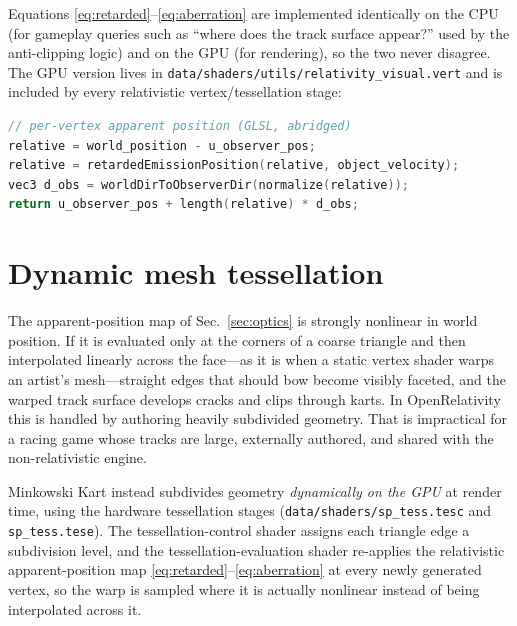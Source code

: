\documentclass[aip,amsmath,amssymb,reprint,nofootinbib]{revtex4-2}
\begin{document}
Equations \eqref{eq:retarded}--\eqref{eq:aberration} are implemented identically
on the CPU (for gameplay queries such as ``where does the track surface appear?''
used by the anti-clipping logic) and on the GPU (for rendering), so the two never
disagree. The GPU version lives in
\texttt{data/shaders/utils/relativity\_visual.vert} and is included by every
relativistic vertex/tessellation stage:

\begin{lstlisting}[language=C]
// per-vertex apparent position (GLSL, abridged)
relative = world_position - u_observer_pos;
relative = retardedEmissionPosition(relative, object_velocity);
vec3 d_obs = worldDirToObserverDir(normalize(relative));
return u_observer_pos + length(relative) * d_obs;
\end{lstlisting}

\section{Dynamic mesh tessellation}\label{sec:tessellation}

The apparent-position map of Sec.~\ref{sec:optics} is strongly nonlinear in
world position. If it is evaluated only at the corners of a coarse triangle and
then interpolated linearly across the face---as it is when a static vertex shader
warps an artist's mesh---straight edges that should bow become visibly faceted,
and the warped track surface develops cracks and clips through karts. In
OpenRelativity this is handled by authoring heavily subdivided geometry. That is
impractical for a racing game whose tracks are large, externally authored, and
shared with the non-relativistic engine.

Minkowski Kart instead subdivides geometry \emph{dynamically on the GPU} at
render time, using the hardware tessellation stages
(\texttt{data/shaders/sp\_tess.tesc} and \texttt{sp\_tess.tese}). The
tessellation-control shader assigns each triangle edge a subdivision level, and
the tessellation-evaluation shader re-applies the relativistic apparent-position
map \eqref{eq:retarded}--\eqref{eq:aberration} at every newly generated vertex,
so the warp is sampled where it is actually nonlinear instead of being
interpolated across it.
\end{document}
